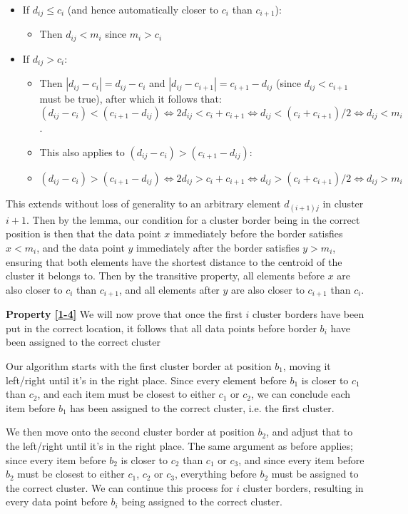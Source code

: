 \documentclass[conference]{IEEEtran}
\begin{document}
\begin{itemize}
    \item If $d_{ij} \leq c_i$ (and hence automatically closer to $c_i$ than $c_{i+1}$):
    \begin{itemize}
        \item Then $d_{ij} < m_i$ since $m_i > c_i$
    \end{itemize}
    \item If $d_{ij} > c_i:$
    \begin{itemize}
        \item Then $|d_{ij} - c_i| = d_{ij} - c_i$ and $|d_{ij}-c_{i+1}| = c_{i+1}-d_{ij}$ (since $d_{ij} < c_{i+1}$ must be true), after which it follows that: $(d_{ij}-c_i) < (c_{i+1}-d_{ij}) \iff 2d_{ij} < c_i+c_{i+1} \iff d_{ij} < (c_i+c_{i+1})/2 \iff d_{ij} < m_i$.
        \item This also applies to $(d_{ij}-c_i) > (c_{i+1}-d_{ij})$: 
        \item $(d_{ij}-c_i) > (c_{i+1}-d_{ij}) \iff 2d_{ij} > c_i+c_{i+1} \iff d_{ij} > (c_i+c_{i+1})/2 \iff d_{ij} > m_i$
    \end{itemize}
\end{itemize}

This extends without loss of generality to an arbitrary element $d_{(i+1)j}$ in cluster $i+1$.
Then by the lemma, our condition for a cluster border being in the correct position is then that
the data point $x$ immediately before the border satisfies $x < m_i$, and the data point $y$ immediately after the border satisfies $y > m_i$,
ensuring that both elements have the shortest distance to the centroid of the cluster it belongs to.
Then by the transitive property, all elements before $x$ are also closer to $c_i$ than $c_{i+1}$, and all elements after $y$ are also closer to $c_{i+1}$ than $c_i$.

\textbf{Property \ref{1-4}}
We will now prove that once the first $i$ cluster borders have been put in the correct location, it follows that all data points before border $b_i$ have been assigned to the correct cluster

Our algorithm starts with the first cluster border at position $b_1$, moving it left/right until it’s in the right place.
Since every element before $b_1$ is closer to $c_1$ than $c_2$, and each item must be closest to either $c_1$ or $c_2$,
we can conclude each item before $b_1$ has been assigned to the correct cluster, i.e. the first cluster.

We then move onto the second cluster border at position $b_2$, and adjust that to the left/right until it’s in the right place.
The same argument as before applies; since every item before $b_2$ is closer to $c_2$ than $c_1$ or $c_3$,
and since every item before $b_2$ must be closest to either $c_1$, $c_2$ or $c_3$, everything before $b_2$ must be assigned to the correct cluster.
We can continue this process for $i$ cluster borders, resulting in every data point before $b_i$ being assigned to the correct cluster.
\end{document}
